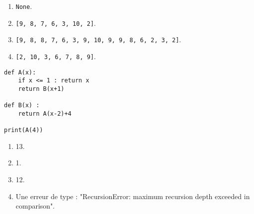 \begin{enumerate}
\item \texttt{None}.
\item \texttt{[9, 8, 7, 6, 3, 10, 2]}. %
\item \texttt{[9, 8, 8, 7, 6, 3, 9, 10, 9, 9, 8, 6, 2, 3, 2]}.
\item \texttt{[2, 10, 3, 6, 7, 8, 9]}.
\end{enumerate}

\begin{lstlisting}
def A(x):
    if x <= 1 : return x
    return B(x+1)

def B(x) :
    return A(x-2)+4

print(A(4))
\end{lstlisting}

\begin{enumerate}
\item 13. %
\item 1.
\item 12.
\item Une erreur de type : "RecursionError: maximum recursion depth exceeded in comparison".
\end{enumerate}
